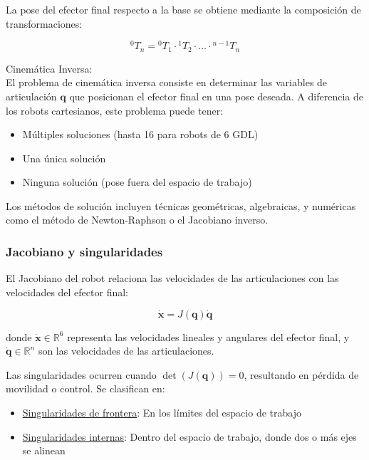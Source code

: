 La pose del efector final respecto a la base se obtiene mediante la composición de transformaciones:

\begin{equation}
{}^0T_n = {}^0T_1 \cdot {}^1T_2 \cdot \ldots \cdot {}^{n-1}T_n
\end{equation}

Cinemática Inversa:\\
\noindent
El problema de cinemática inversa consiste en determinar las variables de articulación $\mathbf{q}$ que posicionan el efector final en una pose deseada. A diferencia de los robots cartesianos, este problema puede tener:

\begin{itemize}[label=$\bullet$]
    \item Múltiples soluciones (hasta 16 para robots de 6 GDL)
    \item Una única solución
    \item Ninguna solución (pose fuera del espacio de trabajo)
\end{itemize}

Los métodos de solución incluyen técnicas geométricas, algebraicas, y numéricas como el método de Newton-Raphson o el Jacobiano inverso.

\subsubsection{Jacobiano y singularidades}

El Jacobiano del robot relaciona las velocidades de las articulaciones con las velocidades del efector final:

\begin{equation}
\dot{\mathbf{x}} = J(\mathbf{q}) \dot{\mathbf{q}}
\end{equation}

donde $\dot{\mathbf{x}} \in \mathbb{R}^6$ representa las velocidades lineales y angulares del efector final, y $\dot{\mathbf{q}} \in \mathbb{R}^n$ son las velocidades de las articulaciones.

Las singularidades ocurren cuando $\det(J(\mathbf{q})) = 0$, resultando en pérdida de movilidad o control. Se clasifican en:

\begin{itemize}[label=$\bullet$]
    \item \underline{Singularidades de frontera}: En los límites del espacio de trabajo
    \item \underline{Singularidades internas}: Dentro del espacio de trabajo, donde dos o más ejes se alinean
\end{itemize}

